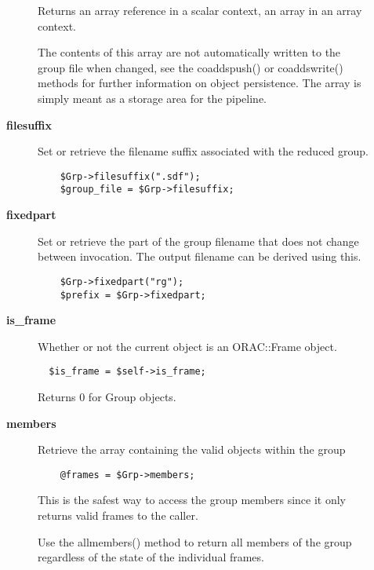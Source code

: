 \begin{description}
\begin{description}
Returns an array reference in a scalar context, an array in an
array context.



The contents of this array are not automatically written to the 
group file when changed, see the coaddspush() or coaddswrite() methods
for further information on object persistence. The array is simply
meant as a storage area for the pipeline.


\item[{\textbf{filesuffix}}] \mbox{}

Set or retrieve the filename suffix associated with the
reduced group.

\begin{verbatim}
    $Grp->filesuffix(".sdf");
    $group_file = $Grp->filesuffix;
\end{verbatim}

\item[{\textbf{fixedpart}}] \mbox{}

Set or retrieve the part of the group filename that does not
change between invocation. The output filename can be derived using
this.

\begin{verbatim}
    $Grp->fixedpart("rg");
    $prefix = $Grp->fixedpart;
\end{verbatim}

\item[{\textbf{is\_frame}}] \mbox{}

Whether or not the current object is an ORAC::Frame object.

\begin{verbatim}
  $is_frame = $self->is_frame;
\end{verbatim}


Returns 0 for Group objects.


\item[{\textbf{members}}] \mbox{}

Retrieve the array containing the valid objects within the group

\begin{verbatim}
    @frames = $Grp->members;
\end{verbatim}


This is the safest way to access the group members
since it only returns valid frames to the caller.



Use the allmembers() method to return all members of the group 
regardless of the state of the individual frames.




\end{description}
\end{description}
